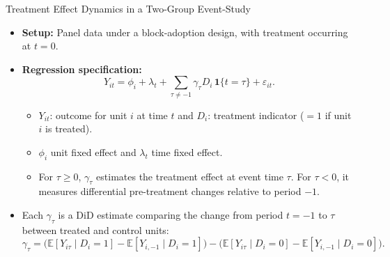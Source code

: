 \documentclass[11pt,aspectratio=169]{beamer}
\newcommand{\E}{\mathbb{E}}
\newcommand{\ind}{\mathbf{1}}
\begin{document}
\begin{frame}{Treatment Effect Dynamics in a Two-Group Event-Study}
\small
\begin{itemize}
  \item \textbf{Setup:} Panel data under a block-adoption design, with treatment occurring at $t=0$.
  \item \textbf{Regression specification:}
  \[Y_{it}=\phi_i+\lambda_t+\sum_{\tau\neq-1}\gamma_\tau D_i\,\ind\{t=\tau\}+\varepsilon_{it}.\]
  \begin{itemize}
    \item $Y_{it}$: outcome for unit $i$ at time $t$ and $D_i$: treatment indicator ($=1$ if unit $i$ is treated).
    \item $\phi_i$ unit fixed effect and $\lambda_t$ time fixed effect.
    \item For $\tau\ge0$, $\gamma_\tau$ estimates the treatment effect at event time $\tau$. For $\tau<0$, it measures differential pre-treatment changes relative to period $-1$.
  \end{itemize}
  \item Each $\gamma_\tau$ is a DiD estimate comparing the change from period $t=-1$ to $\tau$ between treated and control units:
  \[\gamma_\tau=\bigl(\E[Y_{i\tau}\mid D_i=1]-\E[Y_{i,-1}\mid D_i=1]\bigr)-\bigl(\E[Y_{i\tau}\mid D_i=0]-\E[Y_{i,-1}\mid D_i=0]\bigr).\]
\end{itemize}
\end{frame}
\end{document}
